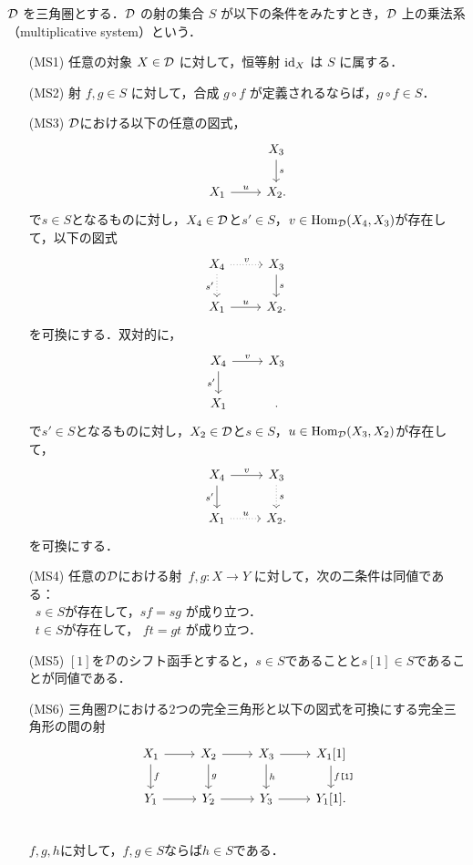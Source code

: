 \begin{defn}[乗法系]\cite[p.152]{KS06}\label{multiplicative}
${\mathcal D}$ を三角圏とする．${\mathcal D}$ の射の集合 $S$ が以下の条件をみたすとき，${\mathcal D}$ 上の乗法系（multiplicative system）という．
\begin{itemize}
  \item[(MS1)] 任意の対象 $X \in {\mathcal D}$ に対して，恒等射 $\mathrm{id}_X$ は $S$ に属する．
  
  \item[(MS2)] 射 $f, g \in S$ に対して，合成 $g \circ f$ が定義されるならば，$g \circ f \in S$．
  
  \item[(MS3)] ${\mathcal D}$における以下の任意の図式，
  \[
  \begin{tikzcd}
		& X_3 \ar[d, "s"] \\
  X_1 \ar[r, "u"] & X_2.
  \end{tikzcd}
  \]
	で$s\in S$となるものに対し，$X_4\in{\mathcal D}$と$s'\in S$，$v\in\operatorname{\mathrm{Hom}}_{{\mathcal D}}(X_4,X_3)$が存在して，以下の図式
  \[
  \begin{tikzcd}
  X_4 \ar[r,dotted,"v"] \ar[d, "s'"',dotted] & X_3 \ar[d, "s"] \\
  X_1 \ar[r, "u"] & X_2.
  \end{tikzcd}
  \]
	を可換にする．双対的に，
  \[
  \begin{tikzcd}
		X_4\ar[r,"v"]\ar[d,"s'",swap]& X_3\\
  X_1  & .
  \end{tikzcd}
  \]
	で$s'\in S$となるものに対し，$X_2\in{\mathcal D}$と$s\in S$，$u\in\operatorname{\mathrm{Hom}}_{{\mathcal D}}(X_3,X_2)$が存在して，
  \[
  \begin{tikzcd}
  X_4 \ar[r,"v"] \ar[d, "s'"'] & X_3 \ar[d, "s",dotted] \\
  X_1 \ar[r, "u",dotted] & X_2.
  \end{tikzcd}
  \]
	を可換にする．
\item[(MS4)]
任意の${\mathcal D}$における射\ $f,g: X \to Y$ に対して，次の二条件は同値である：\\
   \bullet\ $s \in S$が存在して，$sf = sg$ が成り立つ．\\
	\bullet\ 	$t \in S$が存在して， $ft = gt$ が成り立つ．

\item[(MS5)]
	$[1]$を${\mathcal D}$のシフト函手とすると，$s\in S$であることと$s[1]\in S$であることが同値である．
\item[(MS6)]
三角圏${\mathcal D}$における2つの完全三角形と以下の図式を可換にする完全三角形の間の射
			\[
		\begin{tikzcd}
			X_1\ar[r]\ar[d,"f"]& X_2\ar[r]\ar[d,"g"]& X_3\ar[r]\ar[d,"h"] & X_1[1]\ar[d,"f\texttt{[1]}"]\\
			Y_1\ar[r]& Y_2\ar[r]& Y_3\ar[r] & Y_1[1].\\
		\end{tikzcd}
			\]
$f,g,h$に対して，$f,g\in S$ならば$h\in S$である．
\end{itemize}
\end{defn}

